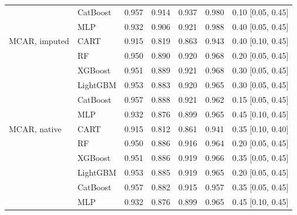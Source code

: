 \begin{table}[p]
\begin{tabular}{@{}llrrrrl@{}}
 & CatBoost & 0.957 & 0.914 & 0.937 & 0.980 & 0.10 [0.05, 0.45] \\
 & MLP & 0.932 & 0.906 & 0.921 & 0.988 & 0.40 [0.05, 0.45] \\
\midrule
MCAR, imputed & CART & 0.915 & 0.819 & 0.863 & 0.943 & 0.40 [0.10, 0.45] \\
 & RF & 0.950 & 0.890 & 0.920 & 0.968 & 0.20 [0.05, 0.45] \\
 & XGBoost & 0.951 & 0.889 & 0.921 & 0.968 & 0.30 [0.05, 0.45] \\
 & LightGBM & 0.953 & 0.883 & 0.920 & 0.965 & 0.30 [0.05, 0.45] \\
 & CatBoost & 0.957 & 0.888 & 0.921 & 0.962 & 0.15 [0.05, 0.45] \\
 & MLP & 0.932 & 0.876 & 0.899 & 0.965 & 0.45 [0.10, 0.45] \\
\midrule
MCAR, native & CART & 0.915 & 0.812 & 0.861 & 0.941 & 0.35 [0.10, 0.40] \\
 & RF & 0.950 & 0.886 & 0.916 & 0.964 & 0.20 [0.05, 0.45] \\
 & XGBoost & 0.951 & 0.886 & 0.919 & 0.966 & 0.35 [0.05, 0.45] \\
 & LightGBM & 0.953 & 0.885 & 0.919 & 0.965 & 0.20 [0.05, 0.45] \\
 & CatBoost & 0.957 & 0.882 & 0.915 & 0.957 & 0.35 [0.05, 0.45] \\
 & MLP & 0.932 & 0.876 & 0.899 & 0.965 & 0.45 [0.10, 0.45] \\
\bottomrule
\end{tabular}
\end{table}

